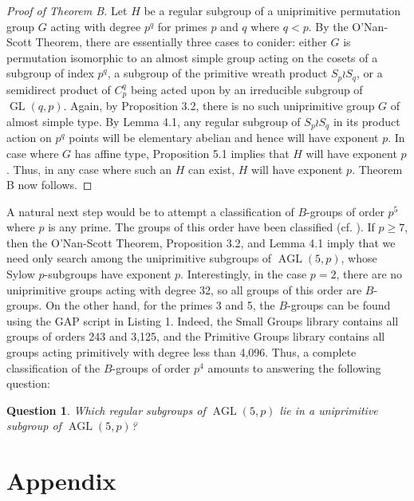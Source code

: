 \documentclass[12pt]{amsart}
\newtheorem{question}[theorem]{Question}
\theoremstyle{definition}
\DeclareMathOperator{\GL}{GL}
\DeclareMathOperator{\AGL}{AGL}
\begin{document}
\begin{proof}[Proof of Theorem B]
	Let $H$ be a regular subgroup of a uniprimitive permutation group $G$ acting with degree $p^q$ for primes $p$ and $q$ where $q < p$. By the O'Nan-Scott Theorem, there are essentially three cases to conider: either $G$ is permutation isomorphic to an almost simple group acting on the cosets of a subgroup of index $p^q$, a subgroup of the primitive wreath product $S_{p} \wr S_q$, or a semidirect product of $C_p^q$ being acted upon by an irreducible subgroup of $\GL(q,p)$. Again, by Proposition 3.2, there is no such uniprimitive group $G$ of almost simple type. By Lemma 4.1, any regular subgroup of $S_p \wr S_q$ in its product action on $p^q$ points will be elementary abelian and hence will have exponent $p$. In case where $G$ has affine type, Proposition 5.1 implies that $H$ will have exponent $p$. Thus, in any case where such an $H$ can exist, $H$ will have exponent $p$. Theorem B now follows.
\end{proof} 

A natural next step would be to attempt a classification of $B$-groups of order $p^5$ where $p$ is any prime. The groups of this order have been classified (cf. \cite{Bender}). If $p \geq 7$, then the O'Nan-Scott Theorem, Proposition 3.2, and Lemma 4.1 imply that we need only search among the uniprimitive subgroups of $\AGL(5,p)$, whose Sylow $p$-subgroups have exponent $p$. Interestingly, in the case $p = 2$, there are no uniprimitive groups acting with degree 32, so all groups of this order are $B$-groups. On the other hand, for the primes 3 and 5, the $B$-groups can be found using the GAP script in Listing 1. Indeed, the Small Groups library contains all groups of orders 243 and 3,125, and the Primitive Groups library contains all groups acting primitively with degree less than 4,096. Thus, a complete classification of the $B$-groups of order $p^4$ amounts to answering the following question:

\begin{question}
	Which regular subgroups of $\AGL(5,p)$ lie in a uniprimitive subgroup of $\AGL(5,p)$?
\end{question}

\printbibliography[heading=bibintoc]

\newpage
\section{Appendix}
	
\end{document}
